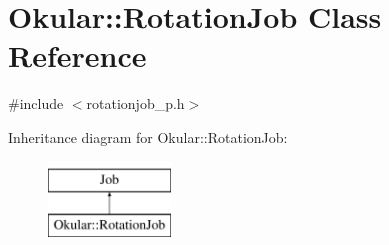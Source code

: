 \hypertarget{classOkular_1_1RotationJob}{\section{Okular\+:\+:Rotation\+Job Class Reference}
\label{classOkular_1_1RotationJob}
}


{\ttfamily \#include $<$rotationjob\+\_\+p.\+h$>$}

Inheritance diagram for Okular\+:\+:Rotation\+Job\+:\begin{figure}[H]
\begin{center}
\leavevmode
\includegraphics[height=2.000000cm]{classOkular_1_1RotationJob}
\end{center}
\end{figure}
